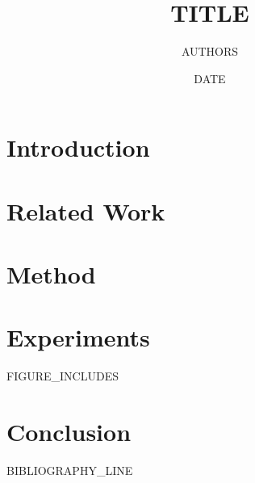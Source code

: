 \documentclass[11pt,a4paper]{article}
\title{ {{TITLE}} }
\author{ {{AUTHORS}} }
\date{ {{DATE}} }
\begin{document}
\maketitle

\begin{abstract}
\end{abstract}

\section{Introduction}

\section{Related Work}

\section{Method}

\section{Experiments}

{{FIGURE_INCLUDES}}

\section{Conclusion}

{{BIBLIOGRAPHY_LINE}}
\end{document}
